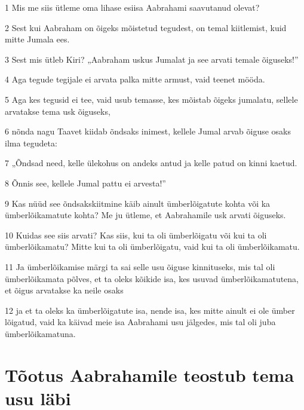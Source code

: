 \par 1 Mis me siis ütleme oma lihase esiisa Aabrahami saavutanud olevat?
\par 2 Sest kui Aabraham on õigeks mõistetud tegudest, on temal kiitlemist, kuid mitte Jumala ees.
\par 3 Sest mis ütleb Kiri? „Aabraham uskus Jumalat ja see arvati temale õiguseks!”
\par 4 Aga tegude tegijale ei arvata palka mitte armust, vaid teenet mööda.
\par 5 Aga kes tegusid ei tee, vaid usub temasse, kes mõistab õigeks jumalatu, sellele arvatakse tema usk õiguseks,
\par 6 nõnda nagu Taavet kiidab õndsaks inimest, kellele Jumal arvab õiguse osaks ilma tegudeta:
\par 7 „Õndsad need, kelle ülekohus on andeks antud ja kelle patud on kinni kaetud.
\par 8 Õnnis see, kellele Jumal pattu ei arvesta!”
\par 9 Kas nüüd see õndsakskiitmine käib ainult ümberlõigatute kohta või ka ümberlõikamatute kohta? Me ju ütleme, et Aabrahamile usk arvati õiguseks.
\par 10 Kuidas see siis arvati? Kas siis, kui ta oli ümberlõigatu või kui ta oli ümberlõikamatu? Mitte kui ta oli ümberlõigatu, vaid kui ta oli ümberlõikamatu.
\par 11 Ja ümberlõikamise märgi ta sai selle usu õiguse kinnituseks, mis tal oli ümberlõikamata põlves, et ta oleks kõikide isa, kes usuvad ümberlõikamatutena, et õigus arvatakse ka neile osaks
\par 12 ja et ta oleks ka ümberlõigatute isa, nende isa, kes mitte ainult ei ole ümber lõigatud, vaid ka käivad meie isa Aabrahami usu jälgedes, mis tal oli juba ümberlõikamatuna.

\section*{Tõotus Aabrahamile teostub tema usu läbi}

